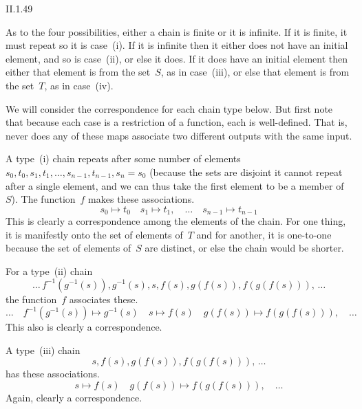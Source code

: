 \begin{ans}{II.1.49}
\begin{exparts}
As to the four possibilities, either a chain is finite or it is infinite.
If it is finite, it must repeat so it is case~(i).
If it is infinite then it either does not have an initial element, and
so is case~(ii), or else it does.
If it does have an initial element then either that element is from
the set~$S$, as in case~(iii), or else that element is from the
set~$T$, as in case~(iv).
\item
We will consider the correspondence for each chain type below.
But first note that because each case is a restriction of a function, each is
well-defined.
That is, never does any of these maps associate two different outputs
with the same input.

A type~(i) chain
repeats after some number of elements
$s_0,t_0,s_1,t_1,\ldots,s_{n-1},t_{n-1},s_n=s_0$
(because the sets are disjoint it cannot repeat after a single element, and
we can thus take the first element to be a member of~$S$).
The function~$f$ makes these associations.
\begin{equation*}
  s_0\mapsto t_0\quad s_1\mapsto t_1,\quad\ldots\quad s_{n-1}\mapsto t_{n-1}
\end{equation*}
This is clearly a correspondence among the elements of the chain.
For one thing, it is manifestly onto the set of elements of~$T$ and for
another, it is one-to-one because the set of elements of~$S$ are
distinct, or else the chain would be shorter.

For a type~(ii) chain
\begin{equation*}
  \ldots{}\,f^{-1}(g^{-1}(s)),g^{-1}(s),s,f(s),g(f(s)),f(g(f(s))),\, \ldots{}
\end{equation*}
the function~$f$ associates these.
\begin{equation*}
  \ldots\quad
  f^{-1}(g^{-1}(s))\mapsto g^{-1}(s)\quad
  s\mapsto f(s)\quad
  g(f(s))\mapsto f(g(f(s))),\quad\ldots
\end{equation*}
This also is clearly a correspondence.

A type~(iii) chain
\begin{equation*}
  s,f(s),g(f(s)),f(g(f(s))),\, \ldots{}
\end{equation*}
has these associations.
\begin{equation*}
  s\mapsto f(s)\quad
  g(f(s))\mapsto f(g(f(s))),\quad\ldots
\end{equation*}
Again, clearly a correspondence.


\end{exparts}
\end{ans}
